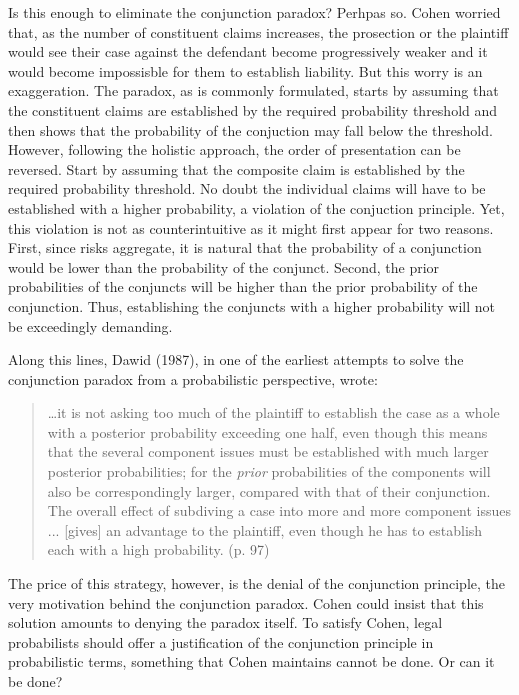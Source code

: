 \documentclass[10pt,dvipsnames,enabledeprecatedfontcommands]{scrartcl}
\begin{document}
Is this enough to eliminate the conjunction paradox? Perhpas so. Cohen
worried that, as the number of constituent claims increases, the
prosection or the plaintiff would see their case against the defendant
become progressively weaker and it would become impossisble for them to
establish liability. But this worry is an exaggeration. The paradox, as
is commonly formulated, starts by assuming that the constituent claims
are established by the required probability threshold and then shows
that the probability of the conjuction may fall below the threshold.
However, following the holistic approach, the order of presentation can
be reversed. Start by assuming that the composite claim is established
by the required probability threshold. No doubt the individual claims
will have to be established with a higher probability, a violation of
the conjuction principle. Yet, this violation is not as counterintuitive
as it might first appear for two reasons. First, since risks aggregate,
it is natural that the probability of a conjunction would be lower than
the probability of the conjunct. Second, the prior probabilities of the
conjuncts will be higher than the prior probability of the conjunction.
Thus, establishing the conjuncts with a higher probability will not be
exceedingly demanding.

Along this lines, Dawid (1987), in one of the earliest attempts to solve
the conjunction paradox from a probabilistic perspective, wrote:

\begin{quote}
\dots it is not asking too much of the plaintiff to establish the case as a whole with a posterior probability exceeding one half, even though this means  that the several component issues must be established with much larger posterior probabilities; for the \textit{prior}  probabilities of the components will also be correspondingly larger, compared with that of their conjunction. The overall effect of subdiving a case into more and more component issues ... [gives] an advantage to the plaintiff, even though he has to establish each with a high probability. (p. 97)
 \end{quote}

\noindent  The price of this strategy, however, is the denial of the
conjunction principle, the very motivation behind the conjunction
paradox. Cohen could insist that this solution amounts to denying the
paradox itself. To satisfy Cohen, legal probabilists should offer a
justification of the conjunction principle in probabilistic terms,
something that Cohen maintains cannot be done. Or can it be done?
\end{document}
